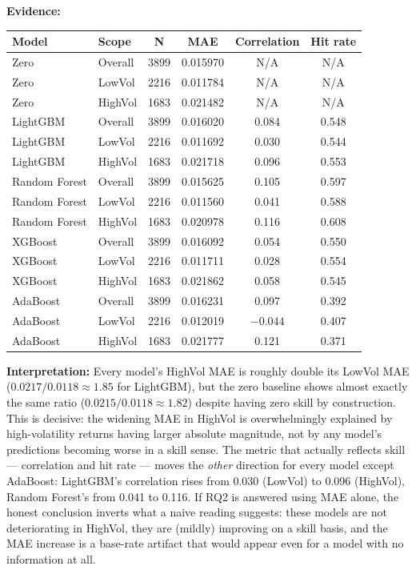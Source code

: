 \documentclass[11pt]{article}
\newcommand{\ebox}[1]{\par\noindent\textbf{Evidence:} #1\par}
\newcommand{\ibox}[1]{\par\noindent\textbf{Interpretation:} #1\par}
\begin{document}
\ebox{\par
\centering
\footnotesize
\begin{tabular}{llcccc}
\toprule
\textbf{Model} & \textbf{Scope} & \textbf{N} & \textbf{MAE} & \textbf{Correlation} & \textbf{Hit rate} \\
\midrule
Zero & Overall & 3899 & 0.015970 & N/A & N/A \\
Zero & LowVol & 2216 & 0.011784 & N/A & N/A \\
Zero & HighVol & 1683 & 0.021482 & N/A & N/A \\
LightGBM & Overall & 3899 & 0.016020 & 0.084 & 0.548 \\
LightGBM & LowVol & 2216 & 0.011692 & 0.030 & 0.544 \\
LightGBM & HighVol & 1683 & 0.021718 & 0.096 & 0.553 \\
Random Forest & Overall & 3899 & 0.015625 & 0.105 & 0.597 \\
Random Forest & LowVol & 2216 & 0.011560 & 0.041 & 0.588 \\
Random Forest & HighVol & 1683 & 0.020978 & 0.116 & 0.608 \\
XGBoost & Overall & 3899 & 0.016092 & 0.054 & 0.550 \\
XGBoost & LowVol & 2216 & 0.011711 & 0.028 & 0.554 \\
XGBoost & HighVol & 1683 & 0.021862 & 0.058 & 0.545 \\
AdaBoost & Overall & 3899 & 0.016231 & 0.097 & 0.392 \\
AdaBoost & LowVol & 2216 & 0.012019 & $-0.044$ & 0.407 \\
AdaBoost & HighVol & 1683 & 0.021777 & 0.121 & 0.371 \\
\bottomrule
\end{tabular}
}

\ibox{Every model's HighVol MAE is roughly double its LowVol MAE ($0.0217/0.0118 \approx 1.85$ for LightGBM), but the zero baseline shows almost exactly the same ratio ($0.0215/0.0118 \approx 1.82$) despite having zero skill by construction. This is decisive: the widening MAE in HighVol is overwhelmingly explained by high-volatility returns having larger absolute magnitude, not by any model's predictions becoming worse in a skill sense. The metric that actually reflects skill --- correlation and hit rate --- moves the \emph{other} direction for every model except AdaBoost: LightGBM's correlation rises from 0.030 (LowVol) to 0.096 (HighVol), Random Forest's from 0.041 to 0.116. If RQ2 is answered using MAE alone, the honest conclusion inverts what a naive reading suggests: these models are not deteriorating in HighVol, they are (mildly) improving on a skill basis, and the MAE increase is a base-rate artifact that would appear even for a model with no information at all.}
\end{document}
